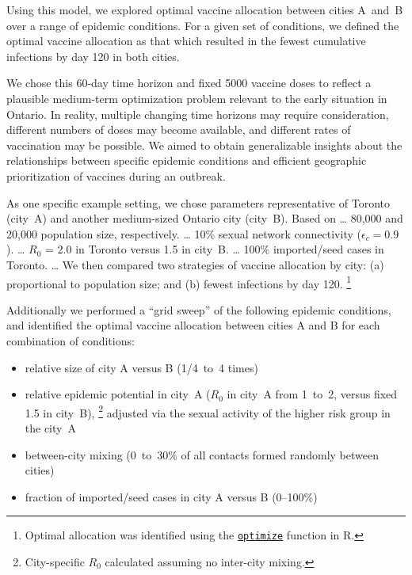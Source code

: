 Using this model, we explored optimal vaccine allocation between cities A~and~B
over a range of epidemic conditions.
For a given set of conditions, we defined the optimal vaccine allocation as that which
resulted in the fewest cumulative infections by day 120 in both cities.
\par
We chose this 60-day time horizon and fixed 5000 vaccine doses to reflect
a plausible medium-term optimization problem relevant to the early \MPXV situation in Ontario.
In reality, multiple changing time horizons may require consideration,
different numbers of doses may become available, and
different rates of vaccination may be possible.
We aimed to obtain generalizable insights about the relationships between
specific epidemic conditions and efficient geographic prioritization of vaccines during an outbreak.
\par
As one specific example setting, we chose parameters representative of
Toronto (city~A) and another medium-sized Ontario city (city~B).
Based on 
\dots
80,000 and 20,000 \GBMSM population size, respectively.
\dots
10\% sexual network connectivity ($\epsilon_c = 0.9$).
\dots
$R_0$ = 2.0 in Toronto versus 1.5 in city~B.
\dots
100\% imported/seed cases in Toronto.
\dots
We then compared two strategies of vaccine allocation by city:
(a) proportional to population size; and
(b) fewest infections by day 120.%
\footnote{Optimal allocation was identified using the
  \href{https://www.rdocumentation.org/link/optimize?package=stats}{\texttt{optimize}} function in R.}
\par
Additionally we performed a ``grid sweep'' of the following epidemic conditions,
and identified the optimal vaccine allocation between cities A and B for each combination of conditions:
\begin{itemize}
  \item relative size of city A versus B (1/4~to~4 times)
  \item relative epidemic potential in city~A ($R_0$ in city~A from 1~to~2, versus fixed 1.5 in city~B),%
  \footnote{City-specific $R_0$ calculated assuming no inter-city mixing.}
        adjusted via the sexual activity of the higher risk group in the city~A
  \item between-city mixing (0~to~30\% of all contacts formed randomly between cities)
  \item fraction of imported/seed cases in city A versus B (0--100\%)
\end{itemize}



